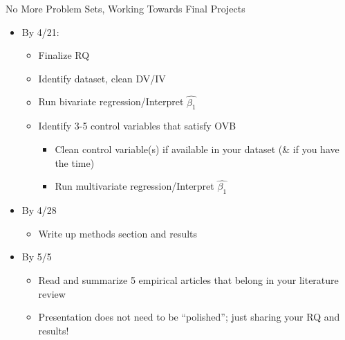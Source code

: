 \documentclass[
  8pt,
  ignorenonframetext,
  dvipsnames]{beamer}
\providecommand{\tightlist}{%
  \setlength{\itemsep}{0pt}\setlength{\parskip}{0pt}}
\let\olditem\item
\renewcommand{\item}{%
  \olditem\vspace{4pt}
}
\begin{document}
\begin{frame}{No More Problem Sets, Working Towards Final Projects}
\protect\hypertarget{no-more-problem-sets-working-towards-final-projects}{}

\begin{itemize}
\tightlist
\item
  By 4/21:

  \begin{itemize}
  \tightlist
  \item
    Finalize RQ
  \item
    Identify dataset, clean DV/IV\\
  \item
    Run bivariate regression/Interpret \(\hat{\beta_1}\)
  \item
    Identify 3-5 control variables that satisfy OVB

    \begin{itemize}
    \tightlist
    \item
      Clean control variable(s) if available in your dataset (\& if you
      have the time)
    \item
      Run multivariate regression/Interpret \(\hat{\beta_1}\)
    \end{itemize}
  \end{itemize}
\item
  By 4/28

  \begin{itemize}
  \tightlist
  \item
    Write up methods section and results\\
  \end{itemize}
\item
  By 5/5

  \begin{itemize}
  \tightlist
  \item
    Read and summarize 5 empirical articles that belong in your
    literature review
  \item
    Presentation does not need to be ``polished''; just sharing your RQ
    and results!
  \end{itemize}
\end{itemize}

\end{frame}
\end{document}
